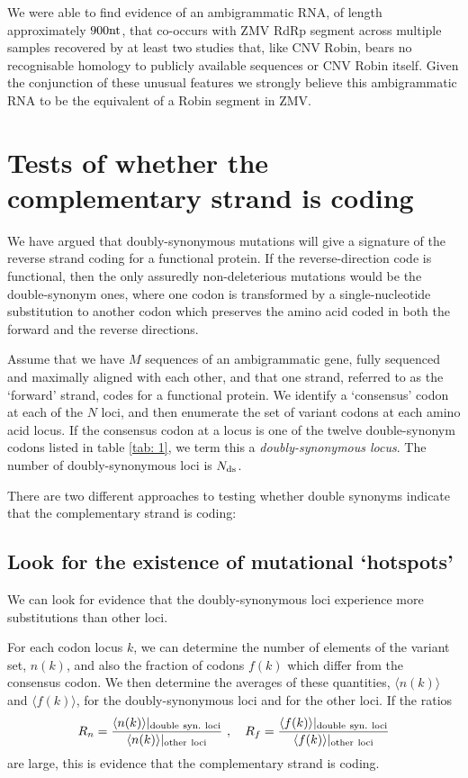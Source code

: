 \documentclass[unnumsec,webpdf,contemporary,large,namedate]{oup-authoring-template}%
\theoremstyle{thmstyleone}%
\theoremstyle{thmstyletwo}%
\theoremstyle{thmstylethree}%
\begin{document}
We were able to find evidence of an ambigrammatic RNA, of length
approximately $900{\rm nt}$, that co-occurs with ZMV RdRp segment across multiple samples recovered by at least two studies that, like CNV Robin, bears no recognisable homology to publicly available sequences or CNV Robin itself.
Given the conjunction of these unusual features we strongly believe this ambigrammatic RNA to be the equivalent of a Robin segment in ZMV.

\section{Tests of whether the complementary strand is coding}
\label{sec: 4}

We have argued that doubly-synonymous mutations will give a signature of the
reverse strand coding for a functional protein. If the reverse-direction code is functional,
then the only assuredly non-deleterious mutations would be the double-synonym ones,
where one codon is transformed by a single-nucleotide substitution to another
codon which preserves the amino acid coded in both the forward and
the reverse directions.

Assume that we have $M$ sequences of an ambigrammatic gene, fully sequenced and
maximally aligned with each other, and that one strand, referred to as the
\lq forward' strand, codes for a functional protein.
We identify a \lq consensus' codon at each of the $N$ loci,
and then enumerate the set of variant codons at each amino acid locus.
If the consensus codon at a locus is one of the twelve
double-synonym codons listed in table \ref{tab: 1}, we term this a \emph{doubly-synonymous locus}.
The number of doubly-synonymous loci is $N_{\rm ds}$.

There are two different approaches to testing whether
double synonyms indicate that the complementary strand is coding:

\subsection{Look for the existence of mutational \lq hotspots'}
\label{sec: 4.1}

We can look for evidence that the doubly-synonymous loci experience more substitutions than other loci.

For each codon locus $k$, we can determine the number of elements of the variant set, $n(k)$,
and also the fraction of codons $f(k)$ which differ from the consensus codon.
We then determine the averages of these quantities, $\langle n(k)\rangle$ and $\langle f(k)\rangle$,
for the doubly-synonymous loci and for the other loci. If the ratios
%
\begin{equation}
\label{eq: 4.1}
R_n=\frac{\langle n(k)\rangle\vert_{\rm double\ syn.\ loci}}{\langle n(k)\rangle\vert_{\rm other\ loci}}
\ ,\ \ \
R_f=\frac{\langle f(k)\rangle\vert_{\rm double\ syn.\ loci}}{\langle f(k)\rangle\vert_{\rm other\ loci}}
\end{equation}
%
are large, this is evidence that the complementary strand is coding.
\end{document}
